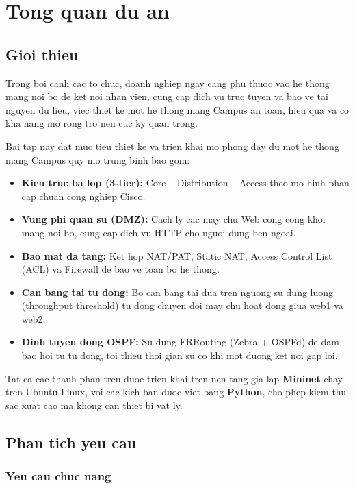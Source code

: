 \chapter{Tong quan du an}

\section{Gioi thieu}

Trong boi canh cac to chuc, doanh nghiep ngay cang phu thuoc vao he thong mang noi bo de ket noi nhan vien, cung cap dich vu truc tuyen va bao ve tai nguyen du lieu, viec thiet ke mot he thong mang Campus an toan, hieu qua va co kha nang mo rong tro nen cuc ky quan trong.

Bai tap nay dat muc tieu thiet ke va trien khai mo phong day du mot he thong mang Campus quy mo trung binh bao gom:

\begin{itemize}
    \item \textbf{Kien truc ba lop (3-tier):} Core -- Distribution -- Access theo mo hinh phan cap chuan cong nghiep Cisco.
    \item \textbf{Vung phi quan su (DMZ):} Cach ly cac may chu Web cong cong khoi mang noi bo, cung cap dich vu HTTP cho nguoi dung ben ngoai.
    \item \textbf{Bao mat da tang:} Ket hop NAT/PAT, Static NAT, Access Control List (ACL) va Firewall de bao ve toan bo he thong.
    \item \textbf{Can bang tai tu dong:} Bo can bang tai dua tren nguong su dung luong (throughput threshold) tu dong chuyen doi may chu hoat dong giua web1 va web2.
    \item \textbf{Dinh tuyen dong OSPF:} Su dung FRRouting (Zebra + OSPFd) de dam bao hoi tu tu dong, toi thieu thoi gian su co khi mot duong ket noi gap loi.
\end{itemize}

Tat ca cac thanh phan tren duoc trien khai tren nen tang gia lap \textbf{Mininet} chay tren Ubuntu Linux, voi cac kich ban duoc viet bang \textbf{Python}, cho phep kiem thu sac xuat cao ma khong can thiet bi vat ly.

\section{Phan tich yeu cau}

\subsection{Yeu cau chuc nang}

